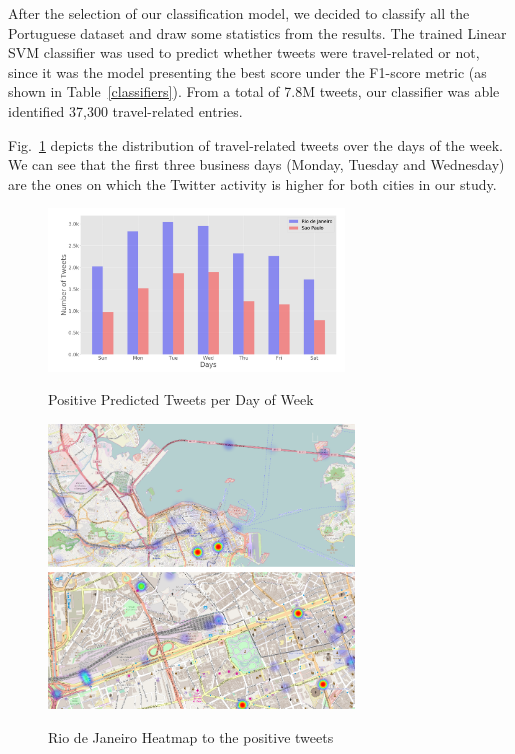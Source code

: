 After the selection of our classification model, we decided to classify all the Portuguese dataset and draw some statistics from the results. The trained Linear SVM classifier was used to predict whether tweets were travel-related or not, since it was the model presenting the best score under the F1-score metric (as shown in Table~\ref{classifiers}). From a total of 7.8M tweets, our classifier was able identified 37,300 travel-related entries.

Fig.~\ref{predicted} depicts the distribution of travel-related tweets over the days of the week. We can see that the first three business days (Monday, Tuesday and Wednesday) are the ones on which the Twitter activity is higher for both cities in our study.

\begin{figure}[!htbp]
  \caption{Positive Predicted Tweets per Day of Week}
  \centering
    \includegraphics[width=0.7\textwidth]{figures/predicted_day_of_week}
    \label{predicted}
\end{figure}

\begin{figure}[!htbp]
  \caption{Rio de Janeiro Heatmap to the positive tweets}
  \centering
    \includegraphics[width=0.725\textwidth]{figures/rio_1}
    \label{rio_heatmap}
\end{figure}

